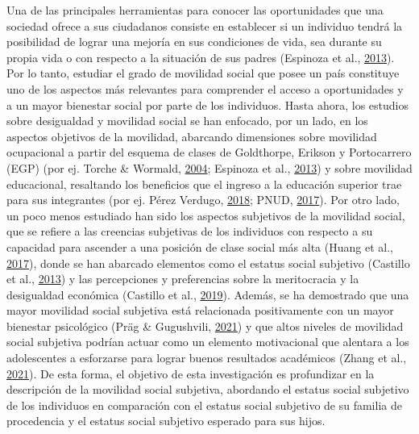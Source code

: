 \documentclass[
]{article}
\begin{document}
Una de las principales herramientas para conocer las oportunidades que
una sociedad ofrece a sus ciudadanos consiste en establecer si un
individuo tendrá la posibilidad de lograr una mejoría en sus condiciones
de vida, sea durante su propia vida o con respecto a la situación de sus
padres (Espinoza et al.,
\protect\hyperlink{ref-espinoza_Estratificacion_2013}{2013}). Por lo
tanto, estudiar el grado de movilidad social que posee un país
constituye uno de los aspectos más relevantes para comprender el acceso
a oportunidades y a un mayor bienestar social por parte de los
individuos. Hasta ahora, los estudios sobre desigualdad y movilidad
social se han enfocado, por un lado, en los aspectos objetivos de la
movilidad, abarcando dimensiones sobre movilidad ocupacional a partir
del esquema de clases de Goldthorpe, Erikson y Portocarrero (EGP) (por
ej. Torche \& Wormald,
\protect\hyperlink{ref-torche_Estratificacion_2004}{2004}; Espinoza et
al., \protect\hyperlink{ref-espinoza_Estratificacion_2013}{2013}) y
sobre movilidad educacional, resaltando los beneficios que el ingreso a
la educación superior trae para sus integrantes (por ej. Pérez Verdugo,
\protect\hyperlink{ref-perezverdugo_Factores_2018}{2018}; PNUD,
\protect\hyperlink{ref-pnud_Desiguales_2017}{2017}). Por otro lado, un
poco menos estudiado han sido los aspectos subjetivos de la movilidad
social, que se refiere a las creencias subjetivas de los individuos con
respecto a su capacidad para ascender a una posición de clase social más
alta (Huang et al., \protect\hyperlink{ref-huang_Effects_2017}{2017}),
donde se han abarcado elementos como el estatus social subjetivo
(Castillo et al., \protect\hyperlink{ref-castillo_Todos_2013}{2013}) y
las percepciones y preferencias sobre la meritocracia y la desigualdad
económica (Castillo et al.,
\protect\hyperlink{ref-castillo_Meritocracia_2019}{2019}). Además, se ha
demostrado que una mayor movilidad social subjetiva está relacionada
positivamente con un mayor bienestar psicológico (Präg \& Gugushvili,
\protect\hyperlink{ref-prag_Subjective_2021}{2021}) y que altos niveles
de movilidad social subjetiva podrían actuar como un elemento
motivacional que alentara a los adolescentes a esforzarse para lograr
buenos resultados académicos (Zhang et al.,
\protect\hyperlink{ref-zhang_Family_2021}{2021}). De esta forma, el
objetivo de esta investigación es profundizar en la descripción de la
movilidad social subjetiva, abordando el estatus social subjetivo de los
individuos en comparación con el estatus social subjetivo de su familia
de procedencia y el estatus social subjetivo esperado para sus hijos.
\end{document}
